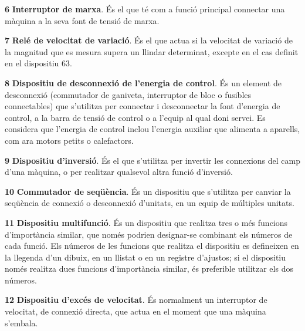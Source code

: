 \begin{multicols}{2}
\begin{list}{}
\item[\textbf{6}]  
\textbf{Interruptor de marxa}. És
el que té com a funció principal connectar una màquina a la seva font de tensió de marxa.

\item[\textbf{7}]    
\textbf{Relé de velocitat de variació}. És el que
actua si la velocitat de variació de la magnitud que es mesura supera un llindar determinat, excepte en el cas definit en el dispositiu 63.

\item[\textbf{8}]   
\textbf{Dispositiu de desconnexió de l'energia de control}. És un element de desconnexió (commutador de ganiveta,
interruptor de bloc o fusibles connectables) que s'utilitza per
connectar i desconnectar la font d'energia de control,  a la barra
de tensió de control o a l'equip al qual doni servei. Es considera
que l'energia de control inclou  l'energia auxiliar que alimenta a
aparells, com ara motors petits o calefactors.

\item[\textbf{9}]   
\textbf{Dispositiu d'inversió}. És el
que s'utilitza per invertir les connexions del camp d'una màquina, o
per realitzar qualsevol altra funció  d'inversió.

\item[\textbf{10}]   
\textbf{Commutador de seqüència}. És un
dispositiu que s'utilitza per canviar la seqüència de connexió o
desconnexió d'unitats, en un equip de múltiples unitats.


\item[\textbf{11}]  
\textbf{Dispositiu multifunció}. És un dispositiu que realitza tres o més funcions d'importància similar, que només podrien designar-se combinant els números de cada funció. Els números de les funcions que realitza el dispositiu es defineixen en la llegenda d'un dibuix, en un llistat o en un registre d'ajustos; si el dispositiu només realitza dues funcions d'importància similar, és preferible utilitzar els dos números.

\item[\textbf{12}]   
\textbf{Dispositiu d'excés de velocitat}. És normalment un
interruptor de velocitat, de connexió directa, que actua en el moment que una màquina  s'embala.


\end{list}
\end{multicols}
